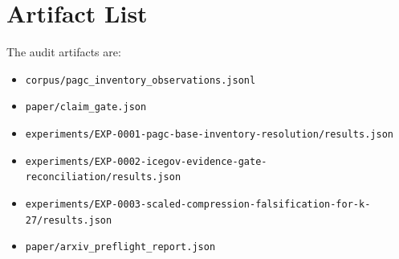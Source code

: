 \section{Artifact List}

The audit artifacts are:
\begin{itemize}
\item \texttt{corpus/pagc\_inventory\_observations.jsonl}
\item \texttt{paper/claim\_gate.json}
\item \texttt{experiments/EXP-0001-pagc-base-inventory-resolution/results.json}
\item \texttt{experiments/EXP-0002-icegov-evidence-gate-reconciliation/results.json}
\item \texttt{experiments/EXP-0003-scaled-compression-falsification-for-k-27/results.json}
\item \texttt{paper/arxiv\_preflight\_report.json}
\end{itemize}
